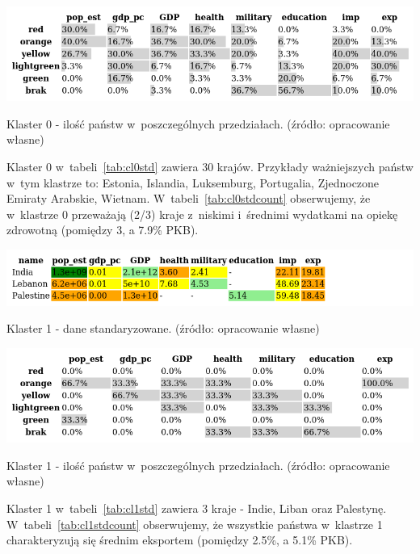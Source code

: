 \documentclass[11pt]{report}
\begin{document}
    \begin{table}[!htp]
        \centering
        \includegraphics[width=\linewidth]{tables/CLUST/cluster0stdkmeanscount.png}
        \caption{Klaster 0 - ilość państw w~poszczególnych przedziałach. (źródło: opracowanie własne)}
        \label{tab:cl0stdcount}
    \end{table}

    Klaster 0 w~tabeli~\ref{tab:cl0std} zawiera 30 krajów.
    Przykłady ważniejszych państw w~tym klastrze to: Estonia, Islandia, Luksemburg, Portugalia, Zjednoczone Emiraty Arabskie, Wietnam.
    W~tabeli~\ref{tab:cl0stdcount} obserwujemy, że w~klastrze 0 przeważają (2/3) kraje z~niskimi i~średnimi wydatkami na opiekę zdrowotną (pomiędzy 3, a 7.9\% PKB).

    \begin{table}[!htp]
        \centering
        \includegraphics[width=\linewidth]{tables/CLUST/cluster1stdkmeans.png}
        \caption{Klaster 1 - dane standaryzowane. (źródło: opracowanie własne)}
        \label{tab:cl1std}
    \end{table}

    \begin{table}[!htp]
        \centering
        \includegraphics[width=\linewidth]{tables/CLUST/cluster1stdkmeanscount.png}
        \caption{Klaster 1 - ilość państw w~poszczególnych przedziałach. (źródło: opracowanie własne)}
        \label{tab:cl1stdcount}
    \end{table}

    Klaster 1 w~tabeli~\ref{tab:cl1std} zawiera 3 kraje - Indie, Liban oraz Palestynę.
    W~tabeli~\ref{tab:cl1stdcount} obserwujemy, że wszystkie państwa w~klastrze 1 charakteryzują się średnim eksportem (pomiędzy 2.5\%, a 5.1\% PKB).
\end{document}

